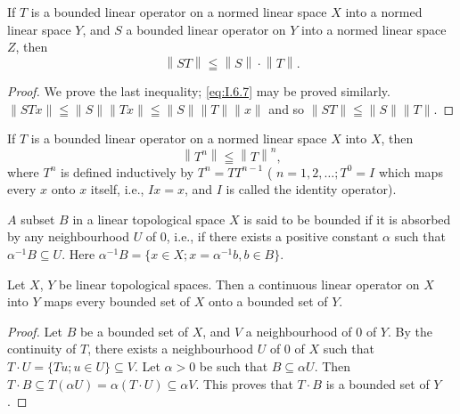 If $T$ is a bounded linear operator on a normed linear space $X$ into a normed linear space $Y$, and $S$ a bounded linear operator on $Y$ into a normed linear space $Z$, then 
\begin{equation}\label{eq:I.6.8}
\left\| S T \right\| \leqq \left\| S \right\| \cdot \left\| T \right\|.
\end{equation}

\begin{proof}
 We prove the last inequality; \eqref{eq:I.6.7} may be proved similarly. $\|STx\| \leqq \|S\| \|Tx\| \leqq \|S\| \|T\| \|x\|$ and so $\|ST\| \leqq \|S\| \|T\|$. 
\end{proof}

\begin{corollaryu} If $T$ is a bounded linear operator on a normed linear space $X$ into $X$, then 
\begin{equation}\label{eq:I.6.9}
\left\| T ^{n} \right\| \leqq \left\| T \right\| ^{n},
\end{equation}
where $T^{n}$ is defined inductively by $T^{n}=TT^{n-1}$ ( $n=1,2,\ldots;T^{0}=I$ which maps every $x$ onto $x$ itself, i.e., $Ix=x$, and $I$ is called the identity operator). 
\end{corollaryu}


\label{sec:I.7}

\begin{definition}\label{def:I.7.Definition.1} $A$ subset $B$ in a linear topological space $X$ is said to be bounded if it is absorbed by any neighbourhood $U$ of $0$, i.e., if there exists a positive constant $\alpha$ such that $\alpha^{-1}B \subseteq U$. Here $\alpha^{-1}B = \{x \in X; x = \alpha^{-1}b, b \in B\}$. 
\end{definition}

\begin{propositionu} Let $X$, $Y$ be linear topological spaces. Then a continuous linear operator on $X$ into $Y$ maps every bounded set of $X$ onto a bounded set of $Y$. 
\end{propositionu}

\begin{proof}
 Let $B$ be a bounded set of $X$, and $V$ a neighbourhood of $0$ of $Y$. By the continuity of $T$, there exists a neighbourhood $U$ of $0$ of $X$ such that $T \cdot U = \{Tu; u \in U\} \subseteq V$. Let $\alpha > 0$ be such that $B \subseteq \alpha U$. Then $T \cdot B \subseteq T(\alpha U) = \alpha(T \cdot U) \subseteq \alpha V$. This proves that $T \cdot B$ is a bounded set of $Y$. 
\end{proof}

